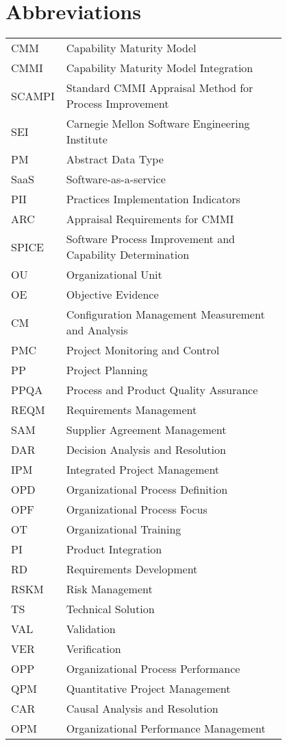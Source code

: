\chapter*{Abbreviations}

\begin{flushleft}
\begin{tabular}{l p{0.8\linewidth}}
CMM      & Capability Maturity Model\\
CMMI      & Capability Maturity Model Integration\\
SCAMPI      & Standard CMMI Appraisal Method for Process Improvement\\
SEI      & Carnegie Mellon Software Engineering Institute\\
PM      & Abstract Data Type\\
SaaS      & Software-as-a-service\\
PII      & Practices Implementation Indicators\\
ARC & Appraisal Requirements for CMMI\\
SPICE & Software Process Improvement and Capability Determination\\
OU & Organizational Unit\\
OE & Objective Evidence\\
CM & Configuration Management Measurement and Analysis\\
PMC & Project Monitoring and Control\\
PP & Project Planning\\
PPQA & Process and Product Quality Assurance\\
REQM & Requirements Management\\
SAM & Supplier Agreement Management\\
DAR & Decision Analysis and Resolution\\
IPM & Integrated Project Management\\
OPD & Organizational Process Definition\\
OPF & Organizational Process Focus\\
OT & Organizational Training\\
PI & Product Integration\\
RD & Requirements Development\\
RSKM & Risk Management\\
TS & Technical Solution\\
VAL & Validation\\
VER & Verification\\
OPP & Organizational Process Performance\\
QPM & Quantitative Project Management\\
CAR & Causal Analysis and Resolution\\
OPM & Organizational Performance Management\\
\end{tabular}
\end{flushleft}

